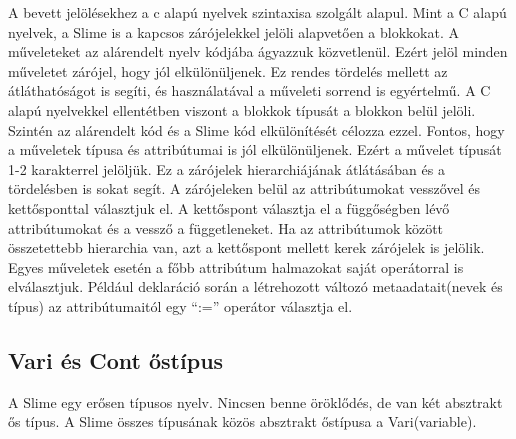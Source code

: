 A bevett jelölésekhez a c alapú nyelvek szintaxisa szolgált alapul. 
Mint a C alapú nyelvek, a Slime is a kapcsos zárójelekkel jelöli alapvetően a blokkokat. 
A műveleteket az alárendelt nyelv kódjába ágyazzuk közvetlenül.
Ezért jelöl minden műveletet zárójel, hogy jól elkülönüljenek. 
Ez rendes tördelés mellett az átláthatóságot is segíti, és használatával a műveleti sorrend is egyértelmű. 
A C alapú nyelvekkel ellentétben viszont a blokkok típusát a blokkon belül jelöli. 
Szintén az alárendelt kód és a Slime kód elkülönítését célozza ezzel.
Fontos, hogy a műveletek típusa és attribútumai is jól elkülönüljenek.
Ezért a művelet típusát 1-2 karakterrel jelöljük.
Ez a zárójelek hierarchiájának átlátásában és a tördelésben is sokat segít. 
A zárójeleken belül az attribútumokat vesszővel és kettősponttal választjuk el. 
A kettőspont választja el a függőségben lévő attribútumokat és a vessző a függetleneket. 
Ha az attribútumok között összetettebb hierarchia van, azt a kettőspont mellett kerek zárójelek is jelölik. 
Egyes műveletek esetén a főbb attribútum halmazokat saját operátorral is elválasztjuk. 
Például deklaráció során a létrehozott változó metaadatait(nevek és típus) az attribútumaitól egy “:=” operátor választja el.

  

\subsection{Vari és Cont őstípus}
A Slime egy erősen típusos nyelv.
Nincsen benne öröklődés, de van két absztrakt ős típus.
A Slime összes típusának közös absztrakt őstípusa a Vari(variable).

